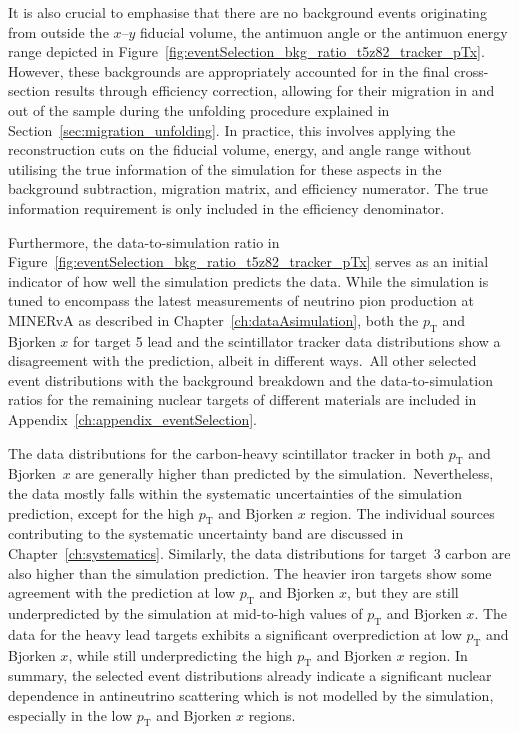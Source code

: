 
It is also crucial to emphasise that there are no background events originating from outside the $x$--$y$ fiducial volume, the antimuon angle or the antimuon energy range depicted in Figure~\ref{fig:eventSelection_bkg_ratio_t5z82_tracker_pTx}. However, these backgrounds are appropriately accounted for in the final cross-section results through efficiency correction, allowing for their migration in and out of the sample during the unfolding procedure explained in Section~\ref{sec:migration_unfolding}. In practice, this involves applying the reconstruction cuts on the fiducial volume, energy, and angle range without utilising the true information of the simulation for these aspects in the background subtraction, migration matrix, and efficiency numerator. The true information requirement is only included in the efficiency denominator.

Furthermore, the data-to-simulation ratio in Figure~\ref{fig:eventSelection_bkg_ratio_t5z82_tracker_pTx} serves as an initial indicator of how well the simulation predicts the data. While the simulation is tuned to encompass the latest measurements of neutrino pion production at MINERvA as described in Chapter~\ref{ch:dataAsimulation}, both the $p_{\text{T}}$ and Bjorken $x$ for target 5 lead and the scintillator tracker data distributions show a disagreement with the prediction, albeit in different ways.~All other selected event distributions with the background breakdown and the data-to-simulation ratios for the remaining nuclear targets of different materials are included in Appendix~\ref{ch:appendix_eventSelection}. 

The data distributions for the carbon-heavy scintillator tracker in both ${p_{\text{T}}}$ and Bjor\-ken~$x$ are generally higher than predicted by the simulation.~Nevertheless, the data mostly falls within the systematic uncertainties of the simulation prediction, except for the high ${p_{\text{T}}}$ and Bjorken $x$ region. The individual sources contributing to the systematic uncertainty band are discussed in Chapter~\ref{ch:systematics}. Similarly, the data distributions for target~3 carbon are also higher than the simulation prediction. The heavier iron targets show some agreement with the prediction at low ${p_{\text{T}}}$ and Bjorken $x$, but they are still underpredicted by the simulation at mid-to-high values of ${p_{\text{T}}}$ and Bjorken $x$. The data for the heavy lead targets exhibits a significant overprediction at low ${p_{\text{T}}}$ and Bjorken $x$, while still underpredicting the high ${p_{\text{T}}}$ and Bjorken $x$ region. In summary, the selected event distributions already indicate a significant nuclear dependence in antineutrino scattering which is not modelled by the simulation, especially in the low ${p_{\text{T}}}$ and Bjorken $x$ regions.

